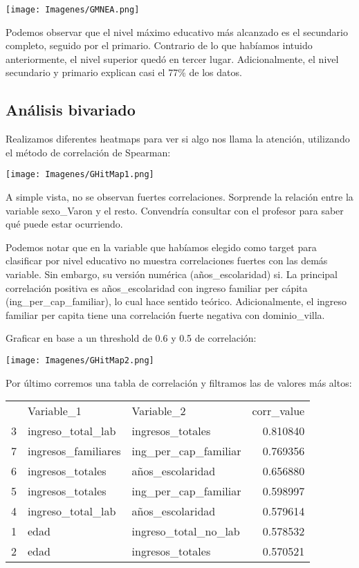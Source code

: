 \documentclass[a4paper]{article}
\begin{document}
            \texttt{[image: Imagenes/GMNEA.png]}
        
            Podemos observar que el nivel máximo educativo más alcanzado es el secundario completo, seguido por el primario. Contrario de lo que habíamos intuido anteriormente, el nivel superior quedó en tercer lugar. Adicionalmente, el nivel secundario y primario explican casi el 77\% de los datos.

    \newpage

    \subsection{Análisis bivariado}

        Realizamos diferentes heatmaps para ver si algo nos llama la atención, utilizando el método de correlación de Spearman:

        \texttt{[image: Imagenes/GHitMap1.png]}

        A simple vista, no se observan fuertes correlaciones. Sorprende la relación entre la variable sexo\_Varon y el resto. Convendría consultar con el profesor para saber qué puede estar ocurriendo.

        Podemos notar que en la variable que habíamos elegido como target para clasificar por nivel educativo no muestra correlaciones fuertes con las demás variable. Sin embargo, su versión numérica (años\_escolaridad) si. La principal correlación positiva es años\_escolaridad con ingreso familiar per cápita (ing\_per\_cap\_familiar), lo cual hace sentido teórico. Adicionalmente, el ingreso familiar per capita tiene una correlación fuerte negativa con dominio\_villa.

        Graficar en base a un threshold de 0.6 y 0.5 de correlación:

        \begin{center}
            \texttt{[image: Imagenes/GHitMap2.png]}
        \end{center}

        Por último corremos una tabla de correlación y filtramos las de valores más altos:


        \begin{tabular}{lllr}
             & Variable\_1 & Variable\_2 & corr\_value \\
             3 & ingreso\_total\_lab & ingresos\_totales & 0.810840 \\
             7 & ingresos\_familiares & ing\_per\_cap\_familiar & 0.769356 \\
             6 & ingresos\_totales & años\_escolaridad & 0.656880 \\
             5 & ingresos\_totales & ing\_per\_cap\_familiar & 0.598997 \\
             4 & ingreso\_total\_lab & años\_escolaridad & 0.579614 \\
             1 & edad & ingreso\_total\_no\_lab & 0.578532 \\
             2 & edad & ingresos\_totales & 0.570521 \\
        \end{tabular}
\end{document}
